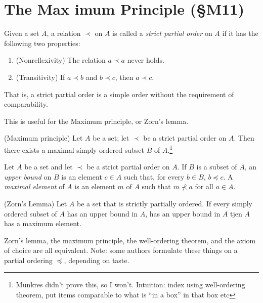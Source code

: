 \documentclass{report}
\begin{document}
\section{The Max imum Principle (\S M11)}
\begin{definition}
  Given a set $A$, a relation $\prec$ on $A$ is called a \emph{strict partial order} on $A$ if it has the following two properties:
  \begin{enumerate}[label={(\arabic*)}]
    \item (Nonreflexivity) The relation $a \prec a$ never holds.
    \item (Transitivity) If $a \prec b$ and $b \prec c$, then $a \prec c$.
  \end{enumerate}
  That is, a strict partial order is a simple order without the requirement of comparability.
\end{definition}

This is useful for the Maximum principle, or Zorn's lemma.
\begin{theorem}
  {\normalfont (Maximum principle)}
  Let $A$ be a set; let  $\prec$ be a strict partial order on $A$.
  Then there exists a maximal simply ordered subset $B$ of $A$.\footnote{Munkres didn't prove this, so I won't. Intuition: index using well-ordering theorem, put items comparable to what is ``in a box'' in that box etc}
\end{theorem}

\begin{definition}
  Let $A$ be a set and let $\prec$ be a strict partial order on $A$.
  If $B$ is a subset of $A$, an \emph{upper bound} on $B$ is an element $c \in A$ such that, for every $b \in B$, $b \preceq c$.
  A \emph{maximal element} of $A$ is an element $m$ of $A$ such that $m \not\prec a$ for all $a \in A$.
\end{definition}

\begin{lemma}
  {\normalfont (Zorn's Lemma)}
  Let $A$ be a set that is strictly partially ordered. 
  If every simply ordered subset of $A$ has an upper bound in $A$, has an upper bound in $A$ tjen $A$ has a maximum element.
\end{lemma}

Zorn's lemma, the maximum principle, the well-ordering theorem, and the axiom of choice are all equivalent.
Note: some authors formulate these things on a partial ordering $\preceq$, depending on taste.
\end{document}
